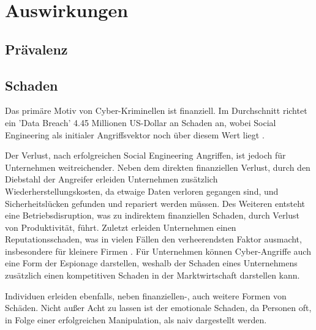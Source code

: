 \chapter{Auswirkungen}
\label{chapter:auswirkungen}


\section{Prävalenz}

\section{Schaden}

Das primäre Motiv von Cyber-Kriminellen ist finanziell. Im Durchschnitt richtet ein 'Data Breach'
4.45 Millionen US-Dollar an Schaden an, wobei Social Engineering als initialer Angriffsvektor noch
über diesem Wert liegt .


Der Verlust, nach erfolgreichen Social Engineering Angriffen, ist jedoch für Unternehmen weitreichender.
Neben dem direkten finanziellen Verlust, durch den Diebstahl der Angreifer erleiden Unternehmen zusätzlich
Wiederherstellungskosten, da etwaige Daten verloren gegangen sind, und Sicherheitslücken gefunden und repariert
werden müssen. Des Weiteren entsteht eine Betriebsdisruption, was zu indirektem finanziellen Schaden, durch
Verlust von Produktivität, führt. Zuletzt erleiden Unternehmen einen Reputationsschaden, was in vielen Fällen
den verheerendsten Faktor ausmacht, insbesondere für kleinere Firmen .
Für Unternehmen können Cyber-Angriffe auch eine Form der Espionage darstellen, weshalb der Schaden eines
Unternehmens zusätzlich einen kompetitiven Schaden in der Marktwirtschaft darstellen kann.

Individuen erleiden ebenfalls, neben finanziellen-, auch weitere Formen von Schäden.
Nicht außer Acht zu lassen ist der emotionale Schaden, da Personen oft, in Folge einer erfolgreichen
Manipulation, als naiv dargestellt werden.







